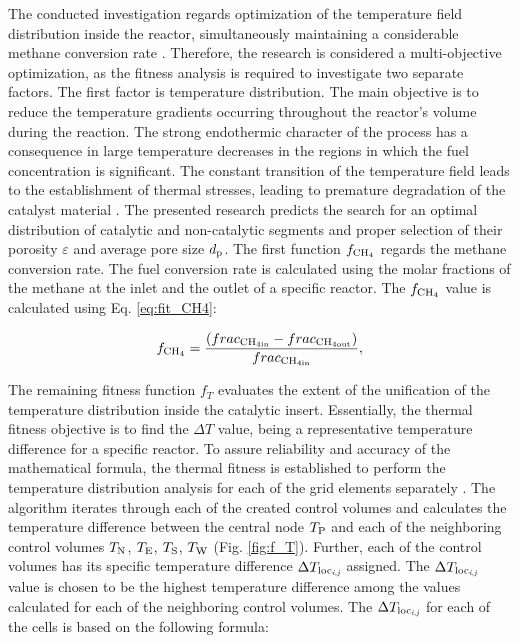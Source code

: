\documentclass[preprint,12pt]{elsarticle}
\begin{document}
The conducted investigation regards optimization of the temperature field distribution inside the reactor, simultaneously maintaining a considerable methane conversion rate \cite{Pajak2021IJHEb}. Therefore, the research is considered a multi-objective optimization, as the fitness analysis is required to investigate two separate factors. The first factor is temperature distribution. The main objective is to reduce the temperature gradients occurring throughout the reactor's volume during the reaction. The strong endothermic character of the process has a consequence in large temperature decreases in the regions in which the fuel concentration is significant. The constant transition of the temperature field leads to the establishment of thermal stresses, leading to premature degradation of the catalyst material \cite{Pajak2021Energies}.  The presented research predicts the search for an optimal distribution of catalytic and non-catalytic segments and proper selection of their porosity $\varepsilon$ and average pore size $d_{\rm{p}}$.  The first function $f_{\rm{CH_4}}$ regards the methane conversion rate. The fuel conversion rate is calculated using the molar fractions of the methane at the inlet and the outlet of a specific reactor. The $f_{\rm{CH_4}}$  value is calculated using Eq. \eqref{eq:fit_CH4}:

\begin{equation}
\label{eq:fit_CH4}
	f_{\rm{CH_4}} = \frac{(frac_{\rm{CH_{4in}}} - frac_{\rm{CH_{4out}}})}{frac_{\rm{CH_{4in}}}},
\end{equation}

The remaining fitness function $f_T$ evaluates the extent of the unification of the temperature distribution inside the catalytic insert. Essentially, the thermal fitness objective is to find the $\Delta T$ value, being a representative temperature difference for a specific reactor. To assure reliability and accuracy of the mathematical formula, the thermal fitness is established to perform the temperature distribution analysis for each of the grid elements separately \cite{Pajak2021IJHEb}. The algorithm iterates through each of the created control volumes and calculates the temperature difference between the central node $T_{\rm{P}}$ and each of the neighboring control volumes $T_{\rm{N}}$, $T_{\rm{E}}$, $T_{\rm{S}}$, $T_{\rm{W}}$ (Fig. \ref{fig:f_T}). Further, each of the control volumes has its specific temperature difference $\Delta T_{\rm{loc}_{\textit{i,j}}}$ assigned. The $\Delta T_{\rm{loc}_{\textit{i,j}}}$ value is chosen to be the highest temperature difference among the values calculated for each of the neighboring control volumes. The $\Delta T_{\rm{loc}_{\textit{i,j}}}$ for each of the cells is based on the following formula: 
\end{document}
